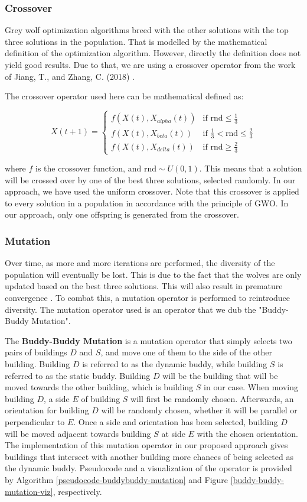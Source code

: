 \subsubsection{Crossover}
Grey wolf optimization algorithms breed with the other solutions with the top three solutions in the population. That is modelled by the mathematical definition of the optimization algorithm. However, directly the definition does not yield good results. Due to that, we are using a crossover operator from the work of Jiang, T., and Zhang, C. (2018) \cite{Jiang2018}.

The crossover operator used here can be mathematical defined as:

$$
X(t + 1) =
\begin{cases}
	f(X(t), X_{alpha}(t)) & \text{if }
	\text{rnd} \leq \frac{1}{3} \\ 
	f(X(t), X_{beta}(t)) & \text{if }
	\frac{1}{3} < \text{rnd} \leq \frac{2}{3} \\
	f(X(t), X_{delta}(t)) & \text{if }
	\text{rnd} \geq \frac{2}{3}
\end{cases} 
$$

where $f$ is the crossover function, and $\text{rnd} \sim U(0, 1)$. This means that a solution will be crossed over by one of the best three solutions, selected randomly. In our approach, we have used the uniform crossover. Note that this crossover is applied to every solution in a population in accordance with the principle of GWO. In our approach, only one offspring is generated from the crossover.

\subsubsection{Mutation}
Over time, as more and more iterations are performed, the diversity of the population will eventually be lost. This is due to the fact that the wolves are only updated based on the best three solutions. This will also result in premature convergence \cite{Jiang2018}. To combat this, a mutation operator is performed to reintroduce diversity. The mutation operator used is an operator that we dub the "Buddy-Buddy Mutation".

The \textbf{Buddy-Buddy Mutation} is a mutation operator that simply selects two pairs of buildings $D$ and $S$, and move one of them to the side of the other building. Building $D$ is referred to as the dynamic buddy, while building $S$ is referred to as the static buddy. Building $D$ will be the building that will be moved towards the other building, which is building $S$ in our case. When moving building $D$, a side $E$ of building $S$ will first be randomly chosen. Afterwards, an orientation for building $D$ will be randomly chosen, whether it will be parallel or perpendicular to $E$. Once a side and orientation has been selected, building $D$ will be moved adjacent towards building $S$ at side $E$ with the chosen orientation. The implementation of this mutation operator in our proposed approach gives buildings that intersect with another building more chances of being selected as the dynamic buddy. Pseudocode and a visualization of the operator is provided by Algorithm \ref{pseudocode-buddybuddy-mutation} and Figure \ref{buddy-buddy-mutation-viz}, respectively.

